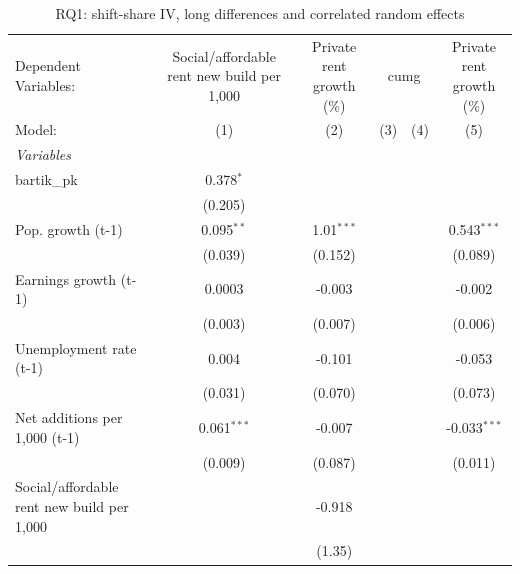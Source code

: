 
\begin{table}[htbp]
   \caption{RQ1: shift-share IV, long differences and correlated random effects}
   \centering
   \begin{tabular}{lccccc}
      \tabularnewline \midrule \midrule
      Dependent Variables: & Social/affordable rent new build per 1,000 & Private rent growth (\%) & \multicolumn{2}{c}{cumg} & Private rent growth (\%)\\
      Model:                                     & (1)           & (2)          & (3)            & (4)            & (5)\\  
      \midrule
      \emph{Variables}\\
      bartik\_pk                                 & 0.378$^{*}$   &              &                &                &   \\   
                                                 & (0.205)       &              &                &                &   \\   
      Pop. growth (t-1)                          & 0.095$^{**}$  & 1.01$^{***}$ &                &                & 0.543$^{***}$\\   
                                                 & (0.039)       & (0.152)      &                &                & (0.089)\\   
      Earnings growth (t-1)                      & 0.0003        & -0.003       &                &                & -0.002\\   
                                                 & (0.003)       & (0.007)      &                &                & (0.006)\\   
      Unemployment rate (t-1)                    & 0.004         & -0.101       &                &                & -0.053\\   
                                                 & (0.031)       & (0.070)      &                &                & (0.073)\\   
      Net additions per 1,000 (t-1)              & 0.061$^{***}$ & -0.007       &                &                & -0.033$^{***}$\\   
                                                 & (0.009)       & (0.087)      &                &                & (0.011)\\   
      Social/affordable rent new build per 1,000 &               & -0.918       &                &                &   \\   
                                                 &               & (1.35)       &                &                &   \\   

\end{tabular}
\end{table}
